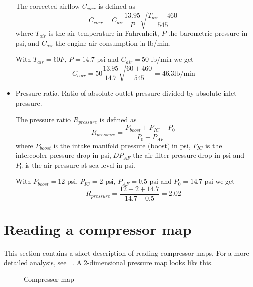 \documentclass[11pt,a4paper]{book}
\newcommand{\Mfig}[1]{%
\begin{figure}
    \centering
    \missingfigure{#1}
    \caption{#1}
\end{figure}}
\begin{document}
\begin{itemize}
        \begin{definition}
            The corrected airflow $C_{corr}$ is defined as
            \begin{equation}
                C_{corr}=C_{air}\frac{13.95}{P}\sqrt{\frac{T_{air} +460}{545}}
            \end{equation}
            where $T_{air}$ is the air temperature in Fahrenheit, $P$ the barometric pressure in
            psi, and $C_{air}$ the
            engine air consumption in lb/min.
            \label{def:corrected-airflow}
        \end{definition}
        \begin{example}
            With $T_{air}=60 F$, $P=14.7$ psi and $C_{air}=50$ lb/min we get
            \begin{equation}
                C_{corr}=50\frac{13.95}{14.7}\sqrt{\frac{60+460}{545}}=46.3\text{
                lb/min}
            \end{equation}
            \label{ex:corrected-airflow}
        \end{example}
    \item Pressure ratio. Ratio of absolute outlet pressure divided by absolute
        inlet pressure.
        \begin{definition}
            The pressure ratio $R_{pressure}$ is defined as
            \begin{equation}
                R_{pressure}=\frac{P_{boost}+P_{IC}+P_0}{P_0-P_{AF}}
            \end{equation}
            where $P_{boost}$ is the intake manifold pressure
            (boost) in psi, $P_{IC}$ is the intercooler pressure
            drop in psi,
            $DP_{AF}$ the air filter pressure drop in psi and $P_0$ is the air pressure
            at sea level in psi.
            \label{}
        \end{definition}
        \begin{example}
            With $P_{boost}=12$ psi, $P_{IC}=2$ psi, $P_{AF}=0.5$ psi and
            $P_0=14.7$ psi we get
            \begin{equation}
                R_{pressure}=\frac{12+2+14.7}{14.7-0.5}=2.02
                \label{}
            \end{equation}

        \end{example}
\end{itemize}
\section{Reading a compressor map}
This section contains a short description of reading compressor maps. For a more
detailed analysis, see
\citeauthor{isaac-lowry_turbo_2004}~\cite{isaac-lowry_turbo_2004}. A 2-dimensional pressure map looks like this.
\Mfig{Compressor map}
\end{document}
